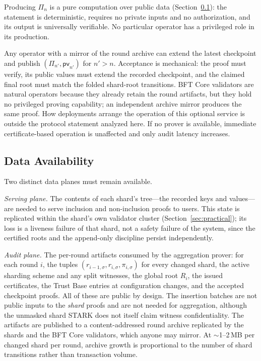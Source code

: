 \documentclass[11pt]{article}
\begin{document}
Producing $\Pi_n$ is a pure computation over public data (Section~\ref{sec:data-availability}): the statement is deterministic, requires no private inputs and no authorization, and its output is universally verifiable. No particular operator has a privileged role in its production.

Any operator with a mirror of the round archive can extend the latest checkpoint and publish $(\Pi_{n'},\mathsf{pv}_{n'})$ for $n'>n$. Acceptance is mechanical: the proof must verify, its public values must extend the recorded checkpoint, and the claimed final root must match the folded shard-root transitions. BFT Core validators are natural operators because they already retain the round artifacts, but they hold no privileged proving capability; an independent archive mirror produces the same proof. How deployments arrange the operation of this optional service is outside the protocol statement analyzed here. If no prover is available, immediate certificate-based operation is unaffected and only audit latency increases.

\subsection{Data Availability}
\label{sec:data-availability}

Two distinct data planes must remain available.

\emph{Serving plane.} The contents of each shard's tree---the recorded keys and values---are needed to serve inclusion and non-inclusion proofs to users. This state is replicated within the shard's own validator cluster (Section~\ref{sec:practical}); its loss is a liveness failure of that shard, not a safety failure of the system, since the certified roots and the append-only discipline persist independently.

\emph{Audit plane.} The per-round artifacts consumed by the aggregation prover: for each round $i$, the tuples $(r_{i-1,\sigma}, r_{i,\sigma}, \pi_{i,\sigma})$ for every changed shard, the active sharding scheme and any split witnesses, the global root $R_i$, the issued certificates, the Trust Base entries at configuration changes, and the accepted checkpoint proofs. All of these are public by design. The insertion batches are not public inputs to the \emph{shard} proofs and are not needed for aggregation, although the unmasked shard STARK does not itself claim witness confidentiality. The artifacts are published to a content-addressed round archive replicated by the shards and the BFT Core validators, which anyone may mirror. At $\sim$1--2\,MB per changed shard per round, archive growth is proportional to the number of shard transitions rather than transaction volume.
\end{document}
